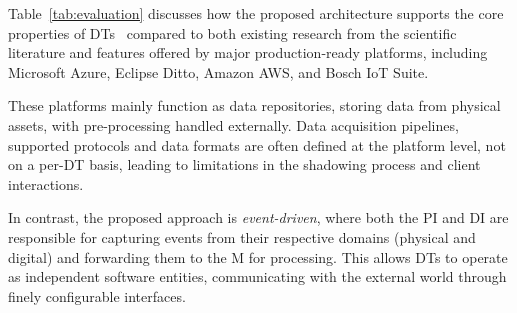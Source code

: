 Table~\ref{tab:evaluation} discusses how the proposed architecture supports the core properties of \acp{DT}~\cite{dt-IoT-context-Minerva-2020} compared to both existing research from the scientific literature and features offered by major production-ready platforms, including Microsoft Azure, Eclipse Ditto, Amazon AWS, and Bosch IoT Suite.

These platforms mainly function as data repositories, storing data from physical assets, with pre-processing handled externally.
Data acquisition pipelines, supported protocols and data formats are often defined at the platform level, not on a per-\ac{DT} basis, leading to limitations in the shadowing process and client interactions.

In contrast, the proposed approach is \emph{event-driven}, where both the \ac{PI} and \ac{DI} are responsible for capturing events from their respective domains (physical and digital) and forwarding them to the \ac{M} for processing. This allows \acp{DT} to operate as independent software entities, communicating with the external world through finely configurable interfaces.

